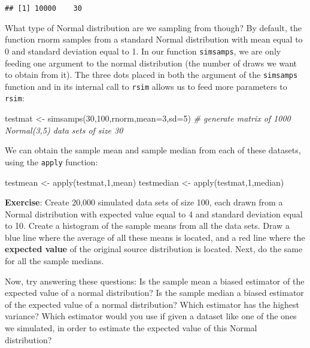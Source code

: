 \documentclass[
]{book}
\newenvironment{Shaded}{\begin{snugshade}}{\end{snugshade}}
\newcommand{\AttributeTok}[1]{\textcolor[rgb]{0.77,0.63,0.00}{#1}}
\newcommand{\CommentTok}[1]{\textcolor[rgb]{0.56,0.35,0.01}{\textit{#1}}}
\newcommand{\DecValTok}[1]{\textcolor[rgb]{0.00,0.00,0.81}{#1}}
\newcommand{\FunctionTok}[1]{\textcolor[rgb]{0.00,0.00,0.00}{#1}}
\newcommand{\NormalTok}[1]{#1}
\newcommand{\OtherTok}[1]{\textcolor[rgb]{0.56,0.35,0.01}{#1}}
\begin{document}
\begin{verbatim}
## [1] 10000    30
\end{verbatim}

What type of Normal distribution are we sampling from though? By default, the function rnorm samples from a standard Normal distribution with mean equal to 0 and standard deviation equal to 1. In our function \texttt{simsamps}, we are only feeding one argument to the normal distribution (the number of draws we want to obtain from it). The three dots placed in both the argument of the \texttt{simsamps} function and in its internal call to \texttt{rsim} allows us to feed more parameters to \texttt{rsim}:

\begin{Shaded}
\begin{Highlighting}[]
\NormalTok{testmat }\OtherTok{\textless{}{-}} \FunctionTok{simsamps}\NormalTok{(}\DecValTok{30}\NormalTok{,}\DecValTok{100}\NormalTok{,rnorm,}\AttributeTok{mean=}\DecValTok{3}\NormalTok{,}\AttributeTok{sd=}\DecValTok{5}\NormalTok{) }\CommentTok{\# generate matrix of 1000 Normal(3,5) data sets of size 30}
\end{Highlighting}
\end{Shaded}

We can obtain the sample mean and sample median from each of these datasets, using the \texttt{apply} function:

\begin{Shaded}
\begin{Highlighting}[]
\NormalTok{testmean }\OtherTok{\textless{}{-}} \FunctionTok{apply}\NormalTok{(testmat,}\DecValTok{1}\NormalTok{,mean)}
\NormalTok{testmedian }\OtherTok{\textless{}{-}} \FunctionTok{apply}\NormalTok{(testmat,}\DecValTok{1}\NormalTok{,median)}
\end{Highlighting}
\end{Shaded}

\textbf{Exercise}: Create 20,000 simulated data sets of size 100, each drawn from a Normal distribution with expected value equal to 4 and standard deviation equal to 10. Create a histogram of the sample means from all the data sets. Draw a blue line where the average of all these means is located, and a red line where the \textbf{expected value} of the original source distribution is located. Next, do the same for all the sample medians.

Now, try answering these questions: Is the sample mean a biased estimator of the expected value of a normal distribution? Is the sample median a biased estimator of the expected value of a normal distribution? Which estimator has the highest variance? Which estimator would you use if given a dataset like one of the ones we simulated, in order to estimate the expected value of this Normal distribution?
\end{document}
